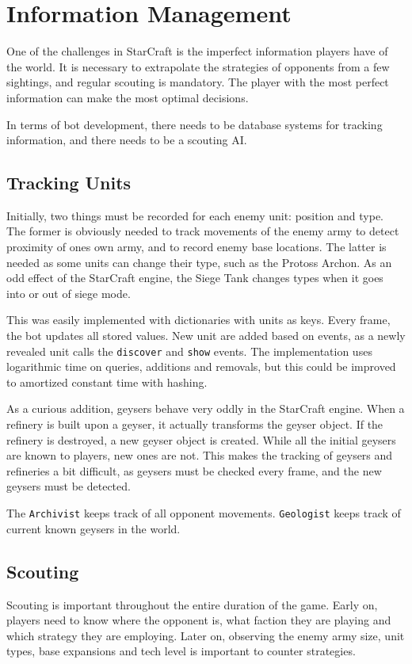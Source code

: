 \chapter{Information Management}
One of the challenges in StarCraft is the imperfect information players have of the world. It is necessary to extrapolate the strategies of opponents from a few sightings, and regular scouting is mandatory. The player with the most perfect information can make the most optimal decisions.

In terms of bot development, there needs to be database systems for tracking information, and there needs to be a scouting AI.

\section{Tracking Units}
Initially, two things must be recorded for each enemy unit: position and type. The former is obviously needed to track movements of the enemy army to detect proximity of ones own army, and to record enemy base locations. The latter is needed as some units can change their type, such as the Protoss Archon. As an odd effect of the StarCraft engine, the Siege Tank changes types when it goes into or out of siege mode.

This was easily implemented with dictionaries with units as keys. Every frame, the bot updates all stored values. New unit are added based on events, as a newly revealed unit calls the \texttt{discover} and \texttt{show} events. The implementation uses logarithmic time on queries, additions and removals, but this could be improved to amortized constant time with hashing.

As a curious addition, geysers behave very oddly in the StarCraft engine. When a refinery is built upon a geyser, it actually transforms the geyser object. If the refinery is destroyed, a new geyser object is created. While all the initial geysers are known to players, new ones are not. This makes the tracking of geysers and refineries a bit difficult, as geysers must be checked every frame, and the new geysers must be detected.

The \texttt{Archivist} keeps track of all opponent movements. \texttt{Geologist} keeps track of current known geysers in the world.

\section{Scouting}
Scouting is important throughout the entire duration of the game. Early on, players need to know where the opponent is, what faction they are playing and which strategy they are employing. Later on, observing the enemy army size, unit types, base expansions and tech level is important to counter strategies.

